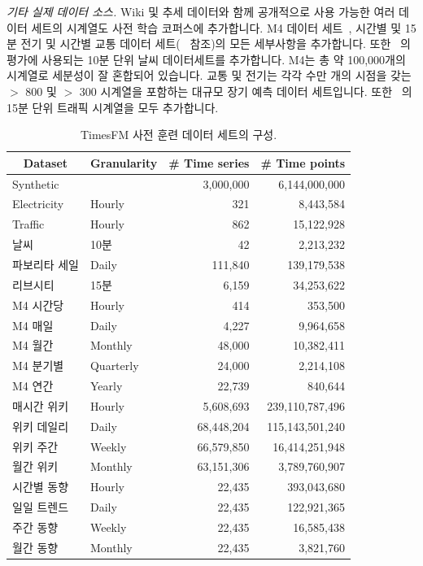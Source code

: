\documentclass{article}
\begin{document}
{\it 기타 실제 데이터 소스.} Wiki 및 추세 데이터와 함께 공개적으로 사용 가능한 여러 데이터 세트의 시계열도 사전 학습 코퍼스에 추가합니다. M4 데이터 세트~\citep{makridakis2022m5}, 시간별 및 15분 전기 및 시간별 교통 데이터 세트(~\citep{zhou2021informer} 참조)의 모든 세부사항을 추가합니다. 또한 ~\citep{zhou2021informer}의 평가에 사용되는 10분 단위 날씨 데이터세트를 추가합니다. M4는 총 약 100,000개의 시계열로 세분성이 잘 혼합되어 있습니다. 교통 및 전기는 각각 수만 개의 시점을 갖는 $>$ 800 및 $>$ 300 시계열을 포함하는 대규모 장기 예측 데이터 세트입니다. 또한 ~\citep{libcitylong}의 15분 단위 트래픽 시계열을 모두 추가합니다.


\begin{table}[!ht]
    \centering
    \caption{TimesFM 사전 훈련 데이터 세트의 구성.}
    \begin{tabular}{llrr}
    \toprule
    \multicolumn{1}{c}{Dataset} & \multicolumn{1}{c}{Granularity} & \multicolumn{1}{c}{\# Time series} & \multicolumn{1}{c}{\# Time points} \\ \midrule
    Synthetic & & 3,000,000 & 6,144,000,000  \\
    Electricity & Hourly & 321 & 8,443,584  \\
    Traffic & Hourly & 862 & 15,122,928  \\
    날씨~\citep{zhou2021informer} & 10분 & 42 & 2,213,232  \\
    파보리타 세일 & Daily & 111,840 & 139,179,538  \\
    리브시티~\citep{libcitylong} & 15분 & 6,159 & 34,253,622  \\
    M4 시간당 & Hourly & 414 & 353,500  \\
    M4 매일 & Daily & 4,227  & 9,964,658  \\
    M4 월간 & Monthly & 48,000 & 10,382,411  \\
    M4 분기별 & Quarterly & 24,000 & 2,214,108  \\
    M4 연간 & Yearly & 22,739 & 840,644  \\
    매시간 위키 & Hourly & 5,608,693 & 239,110,787,496  \\
    위키 데일리 & Daily & 68,448,204 & 115,143,501,240  \\
    위키 주간 & Weekly & 66,579,850 & 16,414,251,948  \\
    월간 위키 & Monthly & 63,151,306 & 3,789,760,907  \\
    시간별 동향 & Hourly & 22,435 & 393,043,680  \\
    일일 트렌드 & Daily & 22,435 & 122,921,365  \\
    주간 동향 & Weekly & 22,435 & 16,585,438  \\
    월간 동향 & Monthly & 22,435 & 3,821,760 \\
    \bottomrule
    \end{tabular}
    \label{tab:train_data}
\end{table}
\end{document}
